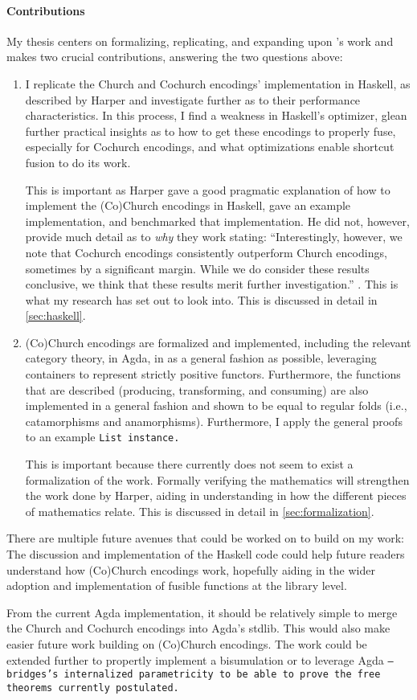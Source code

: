\paragraph{Contributions}
My thesis centers on formalizing, replicating, and expanding upon \cite{Harper2011}'s work and makes two crucial contributions, answering the two questions above:
\begin{enumerate}
    \item I replicate the Church and Cochurch encodings' implementation in Haskell, as described by Harper and investigate further as to their performance characteristics.
    In this process, I find a weakness in Haskell's optimizer, glean further practical insights as to how to get these encodings to properly fuse, especially for Cochurch encodings, and what optimizations enable shortcut fusion to do its work.

    This is important as Harper gave a good pragmatic explanation of how to implement the (Co)Church encodings in Haskell, gave an example implementation, and benchmarked that implementation.
    He did not, however, provide much detail as to \textit{why} they work stating: ``Interestingly, however, we note that Cochurch encodings consistently outperform Church encodings, sometimes by a significant margin. While we do consider these results conclusive, we think that these results merit further investigation.'' \citep{Harper2011}.
    This is what my research has set out to look into.
    This is discussed in detail in \autoref{sec:haskell}.
    \item (Co)Church encodings are formalized and implemented, including the relevant category theory, in Agda, in as a general fashion as possible, leveraging containers \citep{Abbott2005} to represent strictly positive functors.
    Furthermore, the functions that are described (producing, transforming, and consuming) are also implemented in a general fashion and shown to be equal to regular folds (i.e., catamorphisms and anamorphisms).
    Furthermore, I apply the general proofs to an example \tt{List} instance.

    This is important because there currently does not seem to exist a formalization of the work.
    Formally verifying the mathematics will strengthen the work done by Harper, aiding in understanding in how the different pieces of mathematics relate.
    This is discussed in detail in \autoref{sec:formalization}.
\end{enumerate}
There are multiple future avenues that could be worked on to build on my work:
The discussion and implementation of the Haskell code could help future readers understand how (Co)Church encodings work, hopefully aiding in the wider adoption and implementation of fusible functions at the library level.

From the current Agda implementation, it should be relatively simple to merge the Church and Cochurch encodings into Agda's stdlib.
This would also make easier future work building on (Co)Church encodings.
The work could be extended further to propertly implement a bisumulation or to leverage Agda \tt{--bridges}'s internalized parametricity to be able to prove the free theorems currently postulated.

